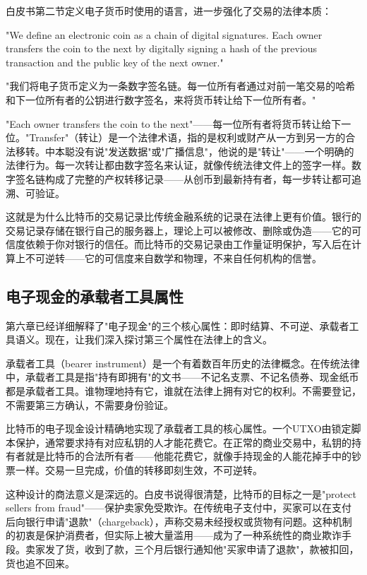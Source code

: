 \documentclass[a4paper,12pt,openany]{ctexbook}
\newenvironment{quoting}{%
  \par\vspace{0.5em}%
  \begin{list}{}{%
    \setlength{\leftmargin}{2em}%
    \setlength{\rightmargin}{2em}%
    \setlength{\parsep}{0.3em}%
    \setlength{\itemsep}{0pt}%
    \setlength{\topsep}{0pt}%
  }%
  \item\relax
}{%
  \end{list}%
  \par\vspace{0.5em}%
}
\begin{document}
白皮书第二节定义电子货币时使用的语言，进一步强化了交易的法律本质：


\begin{quoting}
\small
"We define an electronic coin as a chain of digital signatures. Each owner transfers the coin to the next by digitally signing a hash of the previous transaction and the public key of the next owner."

"我们将电子货币定义为一条数字签名链。每一位所有者通过对前一笔交易的哈希和下一位所有者的公钥进行数字签名，来将货币转让给下一位所有者。"
\end{quoting}


"Each owner transfers the coin to the next"——每一位所有者将货币转让给下一位。"Transfer"（转让）是一个法律术语，指的是权利或财产从一方到另一方的合法移转。中本聪没有说"发送数据"或"广播信息"，他说的是"转让"——一个明确的法律行为。每一次转让都由数字签名来认证，就像传统法律文件上的签字一样。数字签名链构成了完整的产权转移记录——从创币到最新持有者，每一步转让都可追溯、可验证。

这就是为什么比特币的交易记录比传统金融系统的记录在法律上更有价值。银行的交易记录存储在银行自己的服务器上，理论上可以被修改、删除或伪造——它的可信度依赖于你对银行的信任。而比特币的交易记录由工作量证明保护，写入后在计算上不可逆转——它的可信度来自数学和物理，不来自任何机构的信誉。


\subsection*{电子现金的承载者工具属性}


第六章已经详细解释了"电子现金"的三个核心属性：即时结算、不可逆、承载者工具语义。现在，让我们深入探讨第三个属性在法律上的含义。

承载者工具（bearer instrument）是一个有着数百年历史的法律概念。在传统法律中，承载者工具是指"持有即拥有"的文书——不记名支票、不记名债券、现金纸币都是承载者工具。谁物理地持有它，谁就在法律上拥有对它的权利。不需要登记，不需要第三方确认，不需要身份验证。

比特币的电子现金设计精确地实现了承载者工具的核心属性。一个UTXO由锁定脚本保护，通常要求持有对应私钥的人才能花费它。在正常的商业交易中，私钥的持有者就是比特币的合法所有者——他能花费它，就像手持现金的人能花掉手中的钞票一样。交易一旦完成，价值的转移即刻生效，不可逆转。

这种设计的商法意义是深远的。白皮书说得很清楚，比特币的目标之一是"protect sellers from fraud"——保护卖家免受欺诈。在传统电子支付中，买家可以在支付后向银行申请"退款"（chargeback），声称交易未经授权或货物有问题。这种机制的初衷是保护消费者，但实际上被大量滥用——成为了一种系统性的商业欺诈手段。卖家发了货，收到了款，三个月后银行通知他"买家申请了退款"，款被扣回，货也追不回来。
\end{document}
